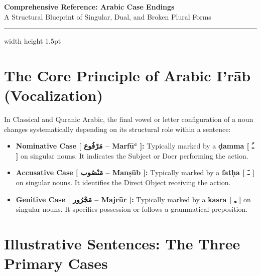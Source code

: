 \documentclass[11pt,a4paper]{article}
\newcommand{\ar}[1]{{\arabicfont #1}}
\begin{document}
\begin{center}
    {\color{primary}\LARGE\bfseries Comprehensive Reference: Arabic Case Endings} \\
    \vspace{0.3cm}
    {\color{secondary}\large A Structural Blueprint of Singular, Dual, and Broken Plural Forms} \\
    \vspace{0.2cm}
    \strut\hrule width \linewidth height 1.5pt \relax
\end{center}

\vspace{0.5cm}

\section{The Core Principle of Arabic I'rāb (Vocalization)}
In Classical and Quranic Arabic, the final vowel or letter configuration of a noun changes systematically depending on its structural role within a sentence:

\begin{itemize}
    \item \textbf{\color{primary}Nominative Case [ \ar{مَرْفُوع} -- Marfūʿ ]:} Typically marked by a \textbf{\color{primary}ḍamma [ \ar{ـُ} ]} on singular nouns. It indicates the Subject or Doer performing the action.
    \item \textbf{\color{secondary}Accusative Case [ \ar{مَنْصُوب} -- Manṣūb ]:} Typically marked by a \textbf{\color{secondary}fatḥa [ \ar{ـَ} ]} on singular nouns. It identifies the Direct Object receiving the action.
    \item \textbf{\color{accent}Genitive Case [ \ar{مَجْرُور} -- Majrūr ]:} Typically marked by a \textbf{\color{accent}kasra [ \ar{ـِ} ]} on singular nouns. It specifies possession or follows a grammatical preposition.
\end{itemize}

\section{Illustrative Sentences: The Three Primary Cases}
\end{document}

